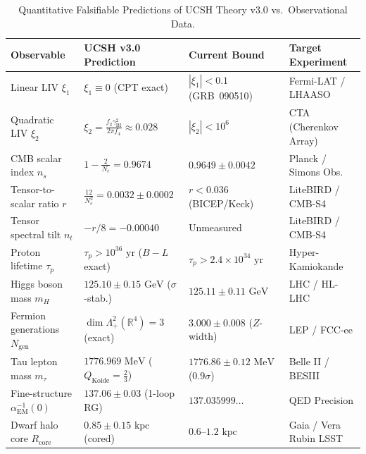 \documentclass[11pt,a4paper]{article}
\theoremstyle{plain}
\theoremstyle{definition}
\theoremstyle{remark}
\newcommand{\R}{\mathbb{R}}
\begin{document}
\begin{table}[htbp]
\centering
\caption{Quantitative Falsifiable Predictions of UCSH Theory v3.0 vs.\ Observational Data.}
\label{tab:predictions}
\vspace{0.5em}
\footnotesize
\setlength{\tabcolsep}{4pt}
\renewcommand{\arraystretch}{1.22}
\begin{tabularx}{\textwidth}{@{}>{\RaggedRight\arraybackslash}p{4.0cm} >{\RaggedRight\arraybackslash}X >{\RaggedRight\arraybackslash}p{3.4cm} >{\RaggedRight\arraybackslash}p{2.9cm}@{}}
\toprule
\textbf{Observable} & \textbf{UCSH v3.0 Prediction} & \textbf{Current Bound} & \textbf{Target Experiment} \\
\midrule
Linear LIV $\xi_1$ & $\xi_1 \equiv 0$ (CPT exact) & $|\xi_1| < 0.1$ (GRB~090510) & Fermi-LAT / LHAASO \\
Quadratic LIV $\xi_2$ & $\xi_2 = \frac{f_2 \gamma_{\mathrm{BI}}^2}{2\pi f_4} \approx 0.028$ & $|\xi_2| < 10^6$ & CTA (Cherenkov Array) \\
CMB scalar index $n_s$ & $1 - \frac{2}{N_e} = 0.9674$ & $0.9649 \pm 0.0042$ & Planck / Simons Obs. \\
Tensor-to-scalar ratio $r$ & $\frac{12}{N_e^2} = 0.0032 \pm 0.0002$ & $r < 0.036$ (BICEP/Keck) & LiteBIRD / CMB-S4 \\
Tensor spectral tilt $n_t$ & $-r/8 = -0.00040$ & Unmeasured & LiteBIRD / CMB-S4 \\
Proton lifetime $\tau_p$ & $\tau_p > 10^{36}\text{ yr}$ ($B{-}L$ exact) & $\tau_p > 2.4 \times 10^{34}\text{ yr}$ & Hyper-Kamiokande \\
Higgs boson mass $m_H$ & $125.10 \pm 0.15\text{ GeV}$ ($\sigma$-stab.) & $125.11 \pm 0.11\text{ GeV}$ & LHC / HL-LHC \\
Fermion generations $N_{\mathrm{gen}}$ & $\dim\Lambda^2_+(\R^4) = 3$ (exact) & $3.000 \pm 0.008$ ($Z$-width) & LEP / FCC-ee \\
Tau lepton mass $m_\tau$ & $1776.969\text{ MeV}$ ($Q_{\mathrm{Koide}}{=}\frac{2}{3}$) & $1776.86 \pm 0.12\text{ MeV}$ ($0.9\sigma$) & Belle II / BESIII \\
Fine-structure $\alpha_{\mathrm{EM}}^{-1}(0)$ & $137.06 \pm 0.03$ (1-loop RG) & $137.035999\dots$ & QED Precision \\
Dwarf halo core $R_{\mathrm{core}}$ & $0.85 \pm 0.15\text{ kpc}$ (cored) & $0.6\text{--}1.2\text{ kpc}$ & Gaia / Vera Rubin LSST \\
\bottomrule
\end{tabularx}
\end{table}
\end{document}
